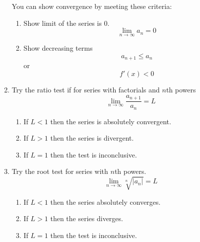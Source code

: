 \documentclass{report}
\begin{document}
\begin{enumerate}
        You can show convergence by meeting these criteria:
        \begin{enumerate}
            \item Show limit of the series is 0. \[\lim_{n \to \infty} a_n = 0\]
            \item Show decreasing terms \[a_{n+1} \leq a_n \] or \[f'(x) < 0\]
        \end{enumerate}
        \item Try the ratio test if for series with factorials and \(n\)th powers
        \[\lim_{n \to \infty} \frac{a_{n+1}}{a_n} = L \]
        \begin{enumerate}
            \item If \(L < 1\) then the series is absolutely convergent.
            \item If \(L > 1\) then the series is divergent.
            \item If \(L = 1\) then the test is inconclusive.
        \end{enumerate}
        \item Try the root test for series with \(n\)th powers. 
        \[\lim_{n \to \infty} \sqrt[n]{\left| a_n \right|} = L\] 
        \begin{enumerate}
            \item If \(L < 1\) then the series absolutely converges.
            \item If \(L > 1\) then the series diverges.
            \item If \(L = 1\) then the test is inconclusive.
        \end{enumerate}
    \end{enumerate}
    
\end{document}
